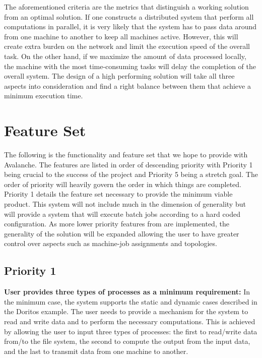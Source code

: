 \documentclass[a4paper]{article}
\begin{document}
The aforementioned criteria are the metrics that distinguish a working solution from an optimal solution. If one constructs a distributed system that perform all computations in parallel, it is very likely that the system has to pass data around from one machine to another to keep all machines active. However, this will create extra burden on the network and limit the execution speed of the overall task. On the other hand, if we maximize the amount of data processed locally, the machine with the most time-consuming tasks will delay the completion of the overall system. The design of a high performing solution will take all three aspects into consideration and find a right balance between them that achieve a minimum execution time.
  

\section{Feature Set}
The following is the functionality and feature set that we hope to provide with Avalanche.  The features are listed in order of descending priority with Priority 1 being crucial to the success of the project and Priority 5 being a stretch goal.  The order of priority will heavily govern the order in which things are completed.  Priority 1 details the feature set necessary to provide the minimum viable product.  This system will not include much in the dimension of generality but will provide a system that will execute batch jobs according to a hard coded configuration.  As more lower priority features from are implemented, the generality of the solution will be expanded allowing the user to have greater control over aspects such as machine-job assignments and topologies. 

\subsection{Priority 1}
{\bf User provides three types of processes as a minimum requirement:} In the minimum case,  the system supports the static and dynamic cases described in the Doritos example. The user needs to provide a mechanism for the system to read and write data and to perform the necessary computations. This is achieved by allowing the user to input three types of processes: the first to read/write data from/to the file system, the second to compute the output from the input data, and the last to transmit data from one machine to another.
\end{document}
